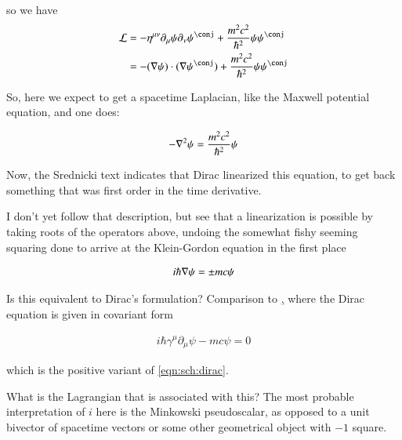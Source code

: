 so we have
\begin{align*}
\LL 
&= -\eta^{\mu\nu} \partial_\mu \psi \partial_\nu \psi^\conj + \frac{m^2 c^2}{\hbar^2} \psi \psi^\conj \\
&= -(\grad \psi) \cdot (\grad \psi^\conj) + \frac{m^2 c^2}{\hbar^2} \psi \psi^\conj \\
\end{align*}

So, here we expect to get a spacetime Laplacian, like the Maxwell potential equation, and one does:

\begin{align*}
-\nabla^2 \psi = \frac{m^2 c^2}{\hbar^2} \psi
\end{align*}

Now, the Srednicki text indicates that Dirac linearized this equation, to get back something that was
first order in the time derivative.

I don't yet follow that description, but see that a linearization is possible by taking roots of the operators above,
undoing the somewhat fishy seeming squaring done to arrive at the Klein-Gordon equation in the first place

\begin{align}\label{eqn:sch:dirac}
i \hbar \nabla \psi = \pm m c \psi
\end{align}

Is this equivalent to Dirac's formulation?  Comparison to 
\href{http://en.wikipedia.org/wiki/Dirac_equation#Covariant_form_and_relativistic_invariance}, where the Dirac equation is given in covariant
form

\begin{align*}
i \hbar \gamma^\mu \partial_\mu \psi - m c \psi = 0
\end{align*}

which is the positive variant of \ref{eqn:sch:dirac}.

What is the Lagrangian that is associated with this?  The most probable interpretation of $i$ here is the Minkowski pseudoscalar, as opposed to
a unit bivector of spacetime vectors or some other geometrical object with $-1$ square.

%
%

%
